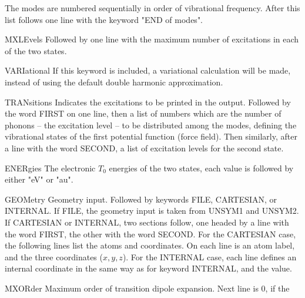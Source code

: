 \begin{keywordlist}
The modes are numbered sequentially in order of vibrational frequency.
After this list follows one line with the keyword "END of modes".
\item[MXLEvels]
Followed by one line with
the maximum number of excitations in each of the two states.
\item[VARIational]
If this keyword is included, a variational calculation will be made,
instead of using the default double harmonic approximation.
\item[TRANsitions]
Indicates the excitations to be printed in the output.
Followed by the word FIRST on one line, then a list of numbers which
are the number of phonons -- the excitation level -- to be distributed
among the modes, defining the vibrational states of the first
potential function (force field). Then similarly, after a line with
the word SECOND, a list of excitation levels for the second state.
\item[ENERgies]
The electronic $T_0$ energies of the two states, each value is followed by
either "eV" or "au".
\item[GEOMetry]
Geometry input. Followed by keywords FILE, CARTESIAN, or INTERNAL.
If FILE, the geometry input is taken from UNSYM1 and UNSYM2.
If CARTESIAN or INTERNAL, two sections follow, one headed by a line
with the word FIRST, the other with the word SECOND. For the CARTESIAN
case, the following lines list the atoms and coordinates. On each line
is an atom label, and the three coordinates ($x,y,z$). For the INTERNAL
case, each line defines an internal coordinate in the same way as for
keyword INTERNAL, and the value.
\item[MXORder]
Maximum order of transition dipole expansion. Next line is 0, if the

\end{keywordlist}
